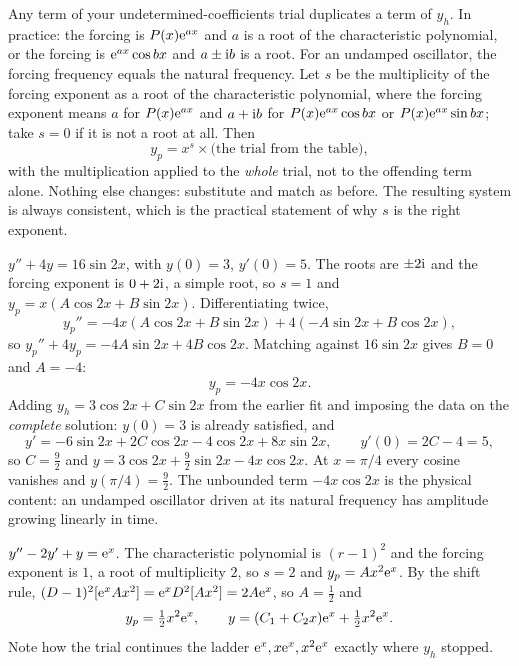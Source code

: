\cue Any term of your undetermined-coefficients trial duplicates a term of $y_h$. In practice: the forcing is $P(x)\mathrm{e}^{ax}$ and $a$ is a root of the characteristic polynomial, or the forcing is $\mathrm{e}^{ax}\cos bx$ and $a\pm\mathrm{i} b$ is a root. For an undamped oscillator, the forcing frequency equals the natural frequency.
\method Let $s$ be the multiplicity of the forcing exponent as a root of the characteristic polynomial, where the forcing exponent means $a$ for $P(x)\mathrm{e}^{ax}$ and $a+\mathrm{i} b$ for $P(x)\mathrm{e}^{ax}\cos bx$ or $P(x)\mathrm{e}^{ax}\sin bx$; take $s=0$ if it is not a root at all. Then
\[y_p=x^{s}\times\bigl(\text{the trial from the table}\bigr),\]
with the multiplication applied to the \emph{whole} trial, not to the offending term alone. Nothing else changes: substitute and match as before. The resulting system is always consistent, which is the practical statement of why $s$ is the right exponent.

\begin{worked}
$y''+4y=16\sin2x$, with $y(0)=3$, $y'(0)=5$. The roots are $\pm2\mathrm{i}$ and the forcing exponent is $0+2\mathrm{i}$, a simple root, so $s=1$ and $y_p=x(A\cos2x+B\sin2x)$. Differentiating twice,
\[y_p''=-4x(A\cos2x+B\sin2x)+4(-A\sin2x+B\cos2x),\]
so $y_p''+4y_p=-4A\sin2x+4B\cos2x$. Matching against $16\sin2x$ gives $B=0$ and $A=-4$:
\[y_p=-4x\cos2x.\]
Adding $y_h=3\cos2x+C\sin2x$ from the earlier fit and imposing the data on the \emph{complete} solution: $y(0)=3$ is already satisfied, and
\[y'=-6\sin2x+2C\cos2x-4\cos2x+8x\sin2x,\qquad y'(0)=2C-4=5,\]
so $C=\tfrac92$ and $y=3\cos2x+\tfrac92\sin2x-4x\cos2x$. At $x=\pi/4$ every cosine vanishes and $y(\pi/4)=\tfrac92$. The unbounded term $-4x\cos2x$ is the physical content: an undamped oscillator driven at its natural frequency has amplitude growing linearly in time.
\end{worked}

\begin{worked}
$y''-2y'+y=\mathrm{e}^{x}$. The characteristic polynomial is $(r-1)^{2}$ and the forcing exponent is $1$, a root of multiplicity $2$, so $s=2$ and $y_p=Ax^{2}\mathrm{e}^{x}$. By the shift rule, $(D-1)^{2}[\mathrm{e}^{x}Ax^{2}]=\mathrm{e}^{x}D^{2}[Ax^{2}]=2A\mathrm{e}^{x}$, so $A=\tfrac12$ and
\[y_p=\tfrac12x^{2}\mathrm{e}^{x},\qquad y=(C_1+C_2x)\mathrm{e}^{x}+\tfrac12x^{2}\mathrm{e}^{x}.\]
Note how the trial continues the ladder $\mathrm{e}^{x},x\mathrm{e}^{x},x^{2}\mathrm{e}^{x}$ exactly where $y_h$ stopped.
\end{worked}

